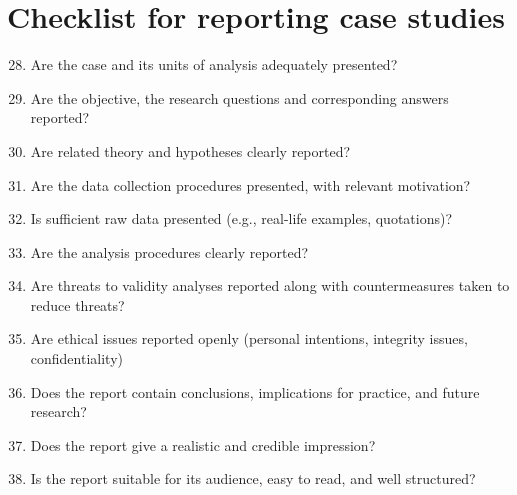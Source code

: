 \section{Checklist for reporting case studies}
\begin{tcolorbox}[colback=black!5!white,colframe=black!75!white,title=Checklist for Preparation for data collection \cite{runeson2009guidelines}]
\begin{enumerate}
    \setcounter{enumi}{27}
    \item  Are the case and its units of analysis adequately presented?
    \item  Are the objective, the research questions and corresponding answers reported?
    \item  Are related theory and hypotheses clearly reported?
    \item Are the data collection procedures presented, with relevant motivation?
    \item Is sufficient raw data presented (e.g., real-life examples, quotations)?
    \item Are the analysis procedures clearly reported?
    \item Are threats to validity analyses reported along with countermeasures taken to reduce threats?
    \item Are ethical issues reported openly (personal intentions, integrity issues, confidentiality)
    \item Does the report contain conclusions, implications for practice, and future research?
    \item Does the report give a realistic and credible impression?
    \item Is the report suitable for its audience, easy to read, and well structured?
\end{enumerate}
\end{tcolorbox}